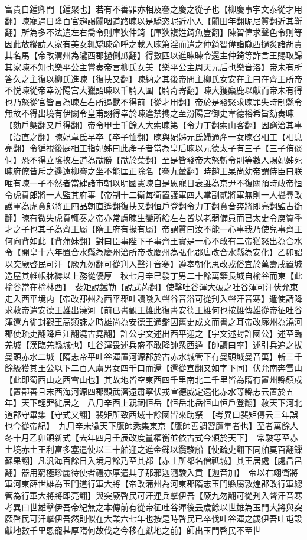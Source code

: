 富貴自鍾卿門【鍾聚也】若有不善罪亦相及謇之慶之從子也【柳慶事宇文泰從才用翻】暕寵遇日隆百官趨謁闐咽道路暕以是驕恣昵近小人【闐田年翻昵尼質翻近其靳翻】所為多不法遣左右喬令則庫狄仲錡【庫狄複姓錡魚豈翻】陳智偉求聲色令則等因此放縱訪人家有美女輒矯暕命呼之載入暕第淫而遣之仲錡智偉詣隴西撾炙諸胡責其名馬【帝改渭州為隴西郡撾側瓜翻】得數匹以進暕暕令還主仲錡等詐言王賜取歸其家暕不知也樂平公主嘗奏帝言柳氏女美【樂平公主周天元后也樂音洛】帝未有所答久之主復以柳氏進暕【復扶又翻】暕納之其後帝問主柳氏女安在主曰在齊王所帝不悦暕從帝幸汾陽宫大獵詔暕以千騎入圍【騎奇寄翻】暕大獲麋鹿以獻而帝未有得也乃怒從官皆言為暕左右所遏獸不得前【從才用翻】帝於是發怒求暕罪失時制縣令無故不得出境有伊闕令皇甫詡得幸於暕違禁攜之至汾陽宫御史韋德裕希旨劾奏暕【劾戶槩翻又戶得翻】帝令甲士千餘人大索暕第【令力丁翻索山客翻】因窮治其事【治直之翻】暕妃韋氏早卒【卒子恤翻】暕與妃姊元氏婦通產一女暕召相工【相息亮翻】令徧視後庭相工指妃姊曰此產子者當為皇后暕以元德太子有三子【三子侑倓侗】恐不得立隂挾左道為猒勝【猒於葉翻】至是皆發帝大怒斬令則等數人賜妃姊死暕府僚皆斥之邊遠柳謇之坐不能匡正除名【謇九輦翻】時趙王杲尚幼帝謂侍臣曰朕唯有暕一子不然者當肆諸市朝以明國憲暕自是恩寵日衰雖為京尹不復關預時政帝恒令虎賁郎將一人監其府事【帝制十二衛每衛置護軍四人掌副貳將軍無則一人攝尋改護軍為虎賁郎將正四品朝直遙翻復扶又翻恒戶登翻令力丁翻賁音奔將即亮翻監古銜翻】暕有微失虎賁輒奏之帝亦常慮暕生變所給左右皆以老弱備員而已太史令庾質季才之子也其子為齊王屬【隋王府有掾有屬】帝謂質曰汝不能一心事我乃使兒事齊王何向背如此【背蒲妹翻】對曰臣事陛下子事齊王實是一心不敢有二帝猶怒出為合水令【開皇十六年置合水縣為慶州治所帝改慶州為弘化郡唐改合水縣為安化】乙卯詔以突厥啓民可汗【厥九勿翻可從刋入聲汗音寒】遵奉朝化思改戎俗宜於萬壽戌置城造屋其帷帳牀褥以上務從優厚　秋七月辛巳發丁男二十餘萬築長城自榆谷而東【此榆谷當在榆林西】　裴矩說鐵勒【說式芮翻】使擊吐谷渾大破之吐谷渾可汗伏允東走入西平境内【帝改鄯州為西平郡吐讀暾入聲谷音浴可從刋入聲汗音寒】遣使請降求救帝遣安德王雄出澆河【前已書觀王雄此復書安德王雄何也按雄傳雄從帝征吐谷渾還方徙封觀王高熲誅之時雄尚為安德王通鑑因舊史成文而書之耳帝改廓州為澆河郡使疏吏翻降戶江翻澆古堯翻】許公宇文述出西平迎之【宇文述封許國公】述至臨羌城【漢臨羌縣城也】吐谷渾畏述兵盛不敢降帥衆西遁【帥讀曰率】述引兵追之拔曼頭赤水二城【隋志帝平吐谷渾置河源郡於古赤水城管下有曼頭城曼音萬】斬三千餘級獲其王公以下二百人虜男女四千口而還【還從宣翻又如字下同】伏允南奔雪山【此即蜀西山之西雪山也】其故地皆空東西四千里南北二千里皆為隋有置州縣鎮戍【置鄯善且末西海河源四郡顯武濟遠肅寧伏戎宣德威定遠化赤水等縣志云置於五年】天下輕罪徙居之　八月辛酉上親祠恒岳【恒岳北岳恒山恒戶登翻】赦天下河北道郡守畢集【守式又翻】裴矩所致西域十餘國皆來助祭　【考異曰裴矩傳云三年誤也今從帝紀】　九月辛未徵天下鷹師悉集東京【鷹師善調習鷹隼者也】至者萬餘人　冬十月乙卯頒新式【去年四月壬辰改度量權衡並依古式今頒於天下】　常駿等至赤土境赤土王利富多塞遣使以三十舶迎之進金鏁以纜駿船【使疏吏翻下同舶莫百翻鏁蘇果翻】凡汎海百餘日入境月餘乃至其都【赤土所都名僧祗城】其王居處【處昌呂翻】器用窮極珍麗待使者禮亦厚遣其子那邪迦隨駿入貢【迦音加】　帝以右翊衛將軍河東薛世雄為玉門道行軍大將【帝改蒲州為河東郡隋志玉門縣屬敦煌郡改行軍總管為行軍大將將即亮翻】與突厥啓民可汗連兵擊伊吾【厥九勿翻可從刋入聲汗音寒　考異曰世雄擊伊吾帝紀無之本傳前有從帝征吐谷渾後云歲餘以世雄為玉門大將與突厥啓民可汗擊伊吾然則似在大業六七年也按是時啓民已卒伐吐谷渾之歲伊吾吐屯設獻地數千里恩寵甚厚隋何故伐之今移在獻地之前】師出玉門啓民不至世